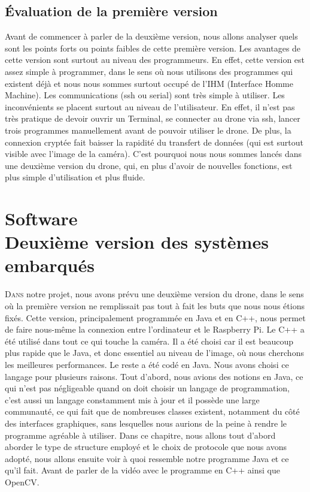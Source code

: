 \documentclass[a4paper,11pt]{report}
\begin{document}
{\section{Évaluation de la première version}

Avant de commencer à parler de la deuxième version, nous allons analyser quels sont les points forts ou points faibles de cette première version. Les avantages de cette version sont surtout au niveau des programmeurs. En effet, cette version est assez simple à programmer, dans le sens où nous utilisons des programmes qui existent déjà et nous nous sommes surtout occupé de l'IHM (Interface Homme Machine). Les communications (ssh ou serial) sont très simple à utiliser. Les inconvénients se placent surtout au niveau de l'utilisateur. En effet, il n'est pas très pratique de devoir ouvrir un Terminal, se connecter au drone via ssh, lancer trois programmes manuellement avant de pouvoir utiliser le drone. De plus, la connexion cryptée fait baisser la rapidité du transfert de données (qui est surtout visible avec l'image de la caméra). C'est pourquoi nous nous sommes lancés dans une deuxième version du drone, qui, en plus d'avoir de nouvelles fonctions, est plus simple d'utilisation et plus fluide. 

\clearpage

\chapter{Software \\ Deuxième version des systèmes embarqués}

\lettrine{D}{ans} notre projet, nous avons prévu une deuxième version du drone, 
dans le sens où la première version ne remplissait pas tout à fait les buts que nous 
nous étions fixés. Cette version, principalement programmée en Java et en C++, 
nous permet de faire nous-même la connexion entre l'ordinateur et le Raspberry Pi. Le C++ a été utilisé dans tout ce qui touche la caméra. Il a été choisi car il est beaucoup plus rapide que le Java, et donc essentiel au niveau de l'image, où nous cherchons les meilleures performances. Le reste a été codé en Java. Nous avons choisi ce langage pour plusieurs raisons. Tout d'abord, nous avions des notions en Java, 
ce qui n'est pas négligeable quand on doit choisir un langage de programmation, c'est aussi un langage constamment mis à jour et il possède une large communauté, ce qui fait que de nombreuses classes existent, notamment du côté des interfaces graphiques,
sans lesquelles nous aurions de la peine à rendre le programme agréable à utiliser. Dans ce chapitre, nous allons tout d'abord aborder le type de structure employé et le choix de protocole
que nous avons adopté, nous allons ensuite voir à quoi ressemble notre programme Java et ce qu'il fait. Avant de parler
de la vidéo avec le programme en C++ ainsi que OpenCV.

}
\end{document}
